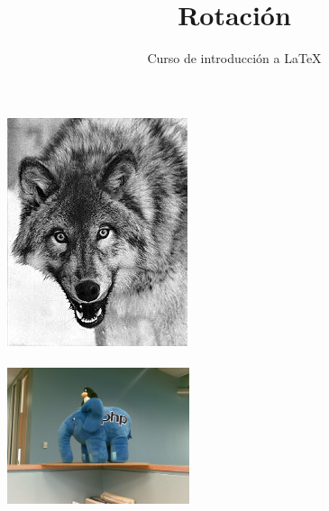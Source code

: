 \documentclass[10pt,letterpaper]{article}
\title{Rotación}
\author{Curso de introducción a LaTeX}
\begin{document}
\maketitle
\includegraphics[angle=90]{img/canis}
%
\\
\\
\includegraphics[width=0.4\textwidth]{img/php}~
\end{document}
